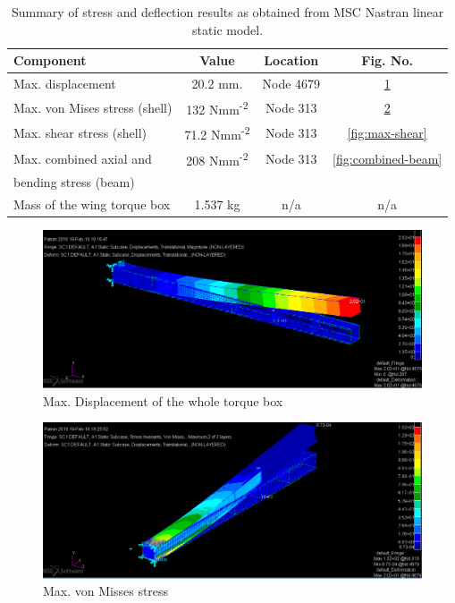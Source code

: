 \documentclass[11pt,a4paper,oneside]{memoir}
\begin{document}
\begin{table}[h]
\centering
\caption{Summary of stress and deflection results as obtained from MSC Nastran linear static model.}
\label{tab:summary-results}
\begin{tabular}{lccc}
  \toprule
  Component                           & Value & Location & Fig. No.   \\
  \midrule
  Max. displacement                   &  20.2 mm. &     Node 4679     &     \ref{fig:max-displacement}       \\
  \midrule
  Max. von Mises stress (shell)       &  132 Nmm\textsuperscript{-2}& Node 313  &    \ref{fig:max-von-mosses}        \\
  \midrule
  Max. shear stress (shell)           &  71.2 Nmm\textsuperscript{-2} & Node 313 &   \ref{fig:max-shear}        \\
  \midrule
  Max. combined axial and             &  208 Nmm\textsuperscript{-2} & Node 313 &   \ref{fig:combined-beam}         \\
  bending stress (beam)               &       &          &            \\
  \midrule
  Mass of the wing torque box         &  1.537 kg &    n/a   &   n/a      \\  \bottomrule
\end{tabular}\end{table}
\begin{figure}[h]
    \centering
    \includegraphics[width = .8\textwidth]{figures/one-displacement-2.png}
    \caption{Max. Displacement of the whole torque box}
    \label{fig:max-displacement}
\end{figure}
\begin{figure}[h]
    \centering
    \includegraphics[width = .8\textwidth]{figures/one-von-misses.png}
    \caption{Max. von Misses stress}
    \label{fig:max-von-mosses}
\end{figure}
\end{document}
